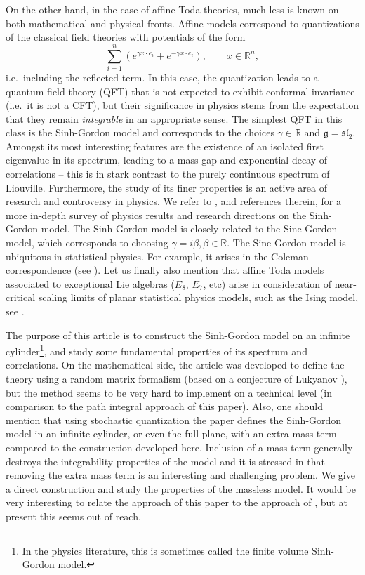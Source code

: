 \documentclass[11pt]{amsart}
\numberwithin{equation}{section}
\newcounter{exa}
\newcounter{conj}
\theoremstyle{definition}
\begin{document}
On the other hand, in the case of affine Toda theories, much less is known on both mathematical and physical fronts. Affine models correspond to quantizations of the classical field theories with potentials of the form
\begin{equation}
\sum_{i=1}^n (e^{\gamma x \cdot e_i} + e^{-\gamma x\cdot e_i}), \qquad x \in \mathbb R^n,	
\end{equation}
i.e.\ including the reflected term. In this case, the quantization leads to a quantum field theory (QFT) that is not expected to exhibit conformal invariance (i.e.\ it is not a CFT), but their significance in physics stems from the expectation that they remain \emph{integrable} in an appropriate sense. The simplest QFT in this class is the Sinh-Gordon model and corresponds to the choices $\gamma \in \mathbb R$ and $\mathfrak g = \mathfrak{sl}_2$. Amongst its most interesting features are the existence of an isolated first eigenvalue in its spectrum, leading to a mass gap and exponential decay of correlations -- this is in stark contrast to the purely continuous spectrum of Liouville. Furthermore, the study of its finer properties is an active area of research and controversy in physics. We refer to \cite{Mussardo21}, and references therein, for a more in-depth survey of physics results and research directions on the Sinh-Gordon model. The Sinh-Gordon model is closely related to the Sine-Gordon model, which corresponds to choosing $\gamma = i\beta, \beta \in \mathbb R$. The Sine-Gordon model is ubiquitous in statistical physics. For example, it arises in the Coleman correspondence (see \cite{Bauerschmidt}). Let us finally also mention that affine Toda models associated to exceptional Lie algebras ($E_8$, $E_7$, etc) arise in consideration of near-critical scaling limits of planar statistical physics models, such as the Ising model, see \cite[Chapter 16]{Mus20}.

The purpose of this article is to construct the Sinh-Gordon model on an infinite cylinder\footnote{In the physics literature, this is sometimes called the finite volume Sinh-Gordon model.}, and study some fundamental properties of its spectrum and correlations. On the mathematical side, the article \cite{BGK} was developed to define the theory using a random matrix formalism (based on a conjecture of Lukyanov \cite{Luk}), but the method seems to be very hard to implement on a technical level (in comparison to the path integral approach of this paper). Also, one should mention that using stochastic quantization the paper \cite{Bara} defines the Sinh-Gordon model in an infinite cylinder, or even the full plane,  with an extra mass term compared to the construction developed here. Inclusion of a mass term generally destroys the integrability properties of the model and it is stressed in  \cite{Bara} that removing the extra mass term is an interesting and challenging problem. We give a direct construction and study the properties of the massless model. It would be very interesting to relate the approach of this paper to the approach of \cite{BGK}, but at present this seems out of reach.
\end{document}
